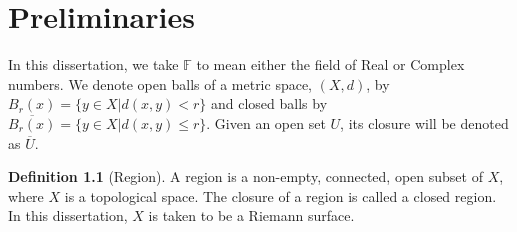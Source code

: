\documentclass[11pt]{report}
\theoremstyle{definition}
\newtheorem{defn}[thm]{Definition}
\begin{document}
\chapter{Preliminaries}

In this dissertation, we take $\mathbb{F}$ to mean either the field of Real or Complex numbers. We denote open balls of a metric space, $(X,d)$, by $B_r(x) = \{y \in X \vert d(x,y) < r\}$ and closed balls by $\overline{B_r(x)} = \{y \in X \vert d(x,y) \leq r\}$. Given an open set $U$, its closure will be denoted as $\overline{U}$.
\begin{defn}[Region]
  A region is a non-empty, connected, open subset of $X$, where $X$ is a topological space. The closure of a region is called a closed region. In this dissertation, $X$ is taken to be a Riemann surface.
\end{defn}
\end{document}

